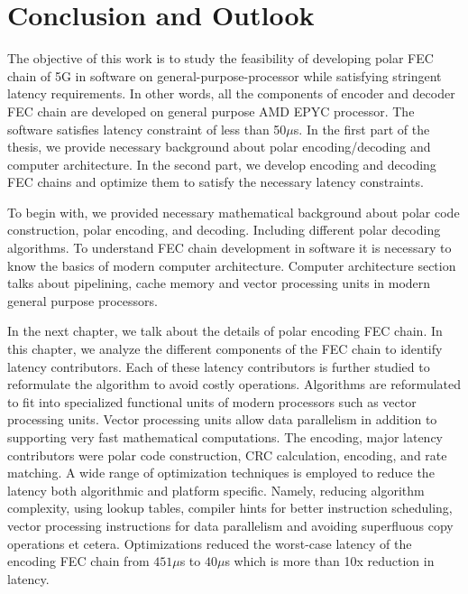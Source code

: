 \chapter{Conclusion and Outlook} \label{chap:conclusion}
The objective of this work is to study the feasibility of developing polar FEC chain of 5G in software on general-purpose-processor while satisfying stringent latency requirements. In other words, all the components of encoder and decoder FEC chain are developed on general purpose AMD EPYC processor. The software satisfies latency constraint of less than 50$\mu$s. In the first part of the thesis, we provide necessary background about polar encoding/decoding and computer architecture. In the second part, we develop encoding and decoding FEC chains and optimize them to satisfy the necessary latency constraints. \newline

To begin with, we provided necessary mathematical background about polar code construction, polar encoding, and decoding. Including different polar decoding algorithms. To understand FEC chain development in software it is necessary to know the basics of modern computer architecture. Computer architecture section talks about pipelining, cache memory and vector processing units in modern general purpose processors. \newline

In the next chapter, we talk about the details of polar encoding FEC chain. In this chapter, we analyze the different components of the FEC chain to identify latency contributors. Each of these latency contributors is further studied to reformulate the algorithm to avoid costly operations. Algorithms are reformulated to fit into specialized functional units of modern processors such as vector processing units. Vector processing units allow data parallelism in addition to supporting very fast mathematical computations. The encoding,  major latency contributors were polar code construction, CRC calculation, encoding, and rate matching. A wide range of optimization techniques is employed to reduce the latency both algorithmic and platform specific. Namely, reducing algorithm complexity, using lookup tables, compiler hints for better instruction scheduling, vector processing instructions for data parallelism and avoiding superfluous copy operations et cetera. Optimizations reduced the worst-case latency of the encoding FEC chain from $451 \mu$s to $40\mu$s which is more than 10x reduction in latency. \newline


